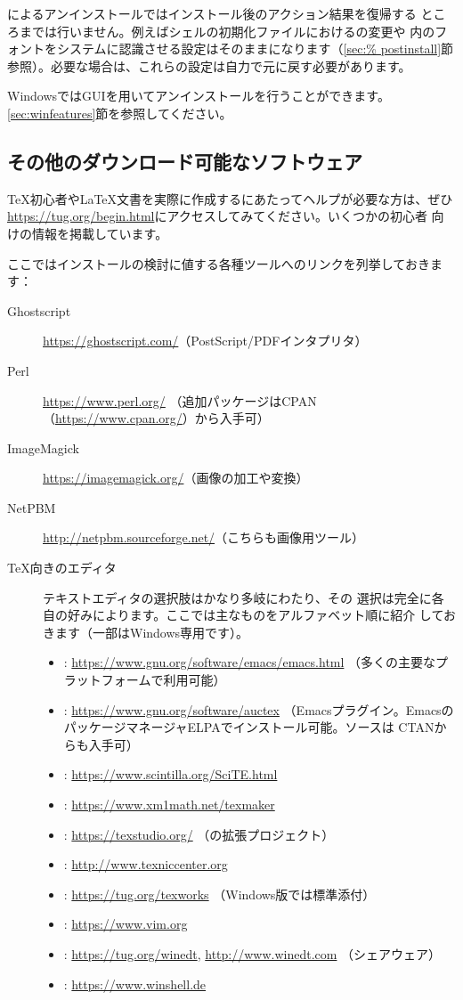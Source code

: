 \documentclass[uplatex,dvipdfmx,12pt]{jsarticle}
\begin{document}
によるアンインストールではインストール後のアクション結果を復帰する
ところまでは行いません。例えばシェルの初期化ファイルにおけるの変更や
\TL 内のフォントをシステムに認識させる設定はそのままになります（\ref{sec:%
postinstall}節参照）。必要な場合は、これらの設定は自力で元に戻す必要があります。

WindowsではGUIを用いてアンインストールを行うことができます。
\ref{sec:winfeatures}節を参照してください。

\subsection{その他のダウンロード可能なソフトウェア}

\TeX 初心者や\LaTeX 文書を実際に作成するにあたってヘルプが必要な方は、ぜひ
\url{https://tug.org/begin.html}にアクセスしてみてください。いくつかの初心者
向けの情報を掲載しています。

ここではインストールの検討に値する各種ツールへのリンクを列挙しておきます：
%
\begin{description}
\item[Ghostscript] \url{https://ghostscript.com/}（PostScript/PDFインタプリタ）
\item[Perl] \url{https://www.perl.org/}%
  （追加パッケージはCPAN（\url{https://www.cpan.org/}）から入手可）
\item[ImageMagick] \url{https://imagemagick.org/}（画像の加工や変換）
\item[NetPBM] \url{http://netpbm.sourceforge.net/}（こちらも画像用ツール）
\item[\TeX 向きのエディタ] テキストエディタの選択肢はかなり多岐にわたり、その
  選択は完全に各自の好みによります。ここでは主なものをアルファベット順に紹介
  しておきます（一部はWindows専用です）。
  \begin{itemize}
  \item {}: \url{https://www.gnu.org/software/emacs/emacs.html}%
    （多くの主要なプラットフォームで利用可能）
  \item {}: \url{https://www.gnu.org/software/auctex}%
    （Emacsプラグイン。EmacsのパッケージマネージャELPAでインストール可能。ソースは
    CTANからも入手可）
  \item {}: \url{https://www.scintilla.org/SciTE.html}
  \item {}: \url{https://www.xm1math.net/texmaker}
  \item {}: \url{https://texstudio.org/}%
    （の拡張プロジェクト）
  \item {}: \url{http://www.texniccenter.org}
  \item {}: \url{https://tug.org/texworks}%
    （Windows版\TL では標準添付）
  \item {}: \url{https://www.vim.org}
  \item {}: \url{https://tug.org/winedt}, \url{http://www.winedt.com}%
    （シェアウェア）
  \item {}: \url{https://www.winshell.de}
  \end{itemize}
\end{description}
\end{document}
